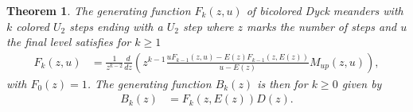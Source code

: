 \documentclass[10pt,a4paper]{amsart}
\newcommand{\Mup}{M_{up}}
\newtheorem{theorem}{Theorem}
\begin{document}
\begin{theorem}\label{theo:recursiveAk}
    The generating function $F_{k}(z,u)$ of bicolored Dyck meanders with $k$ colored $U_2$ steps ending with a $U_2$ step where $z$ marks the number of steps and $u$ the final level satisfies for $k \geq 1$
    \begin{align*}
        F_{k}(z,u) 
            &= \frac{1}{z^{k-2}}\frac{d}{dz} \left( z^{k-1} \frac{u F_{k-1}(z,u) -  E(z) F_{k-1}(z,E(z))}{u -  E(z)} \Mup(z,u) \right),
    \end{align*}
    with $F_0(z) = 1$. 
    The generating function $B_k(z)$ is then for $k \geq 0$ given by
    \begin{align*}
        B_k(z) 
            &= F_{k}(z, E(z)) D(z).
    \end{align*}
\end{theorem}
\end{document}
